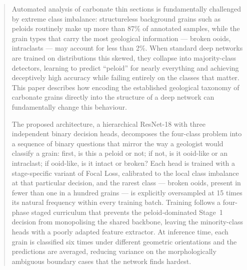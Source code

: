 \documentclass[a4paper,fleqn]{cas-dc}
\begin{document}
\begin{abstract}
Automated analysis of carbonate thin sections is fundamentally challenged by extreme class imbalance: structureless background grains such as peloids routinely make up more than 87\% of annotated samples, while the grain types that carry the most geological information --- broken ooids, intraclasts --- may account for less than 2\%. When standard deep networks are trained on distributions this skewed, they collapse into majority-class detectors, learning to predict ``peloid'' for nearly everything and achieving deceptively high accuracy while failing entirely on the classes that matter. This paper describes how encoding the established geological taxonomy of carbonate grains directly into the structure of a deep network can fundamentally change this behaviour.

The proposed architecture, a hierarchical ResNet-18 with three independent binary decision heads, decomposes the four-class problem into a sequence of binary questions that mirror the way a geologist would classify a grain: first, is this a peloid or not; if not, is it ooid-like or an intraclast; if ooid-like, is it intact or broken? Each head is trained with a stage-specific variant of Focal Loss, calibrated to the local class imbalance at that particular decision, and the rarest class --- broken ooids, present in fewer than one in a hundred grains --- is explicitly oversampled at 15 times its natural frequency within every training batch. Training follows a four-phase staged curriculum that prevents the peloid-dominated Stage~1 decision from monopolising the shared backbone, leaving the minority-class heads with a poorly adapted feature extractor. At inference time, each grain is classified six times under different geometric orientations and the predictions are averaged, reducing variance on the morphologically ambiguous boundary cases that the network finds hardest.


\end{abstract}
\end{document}
